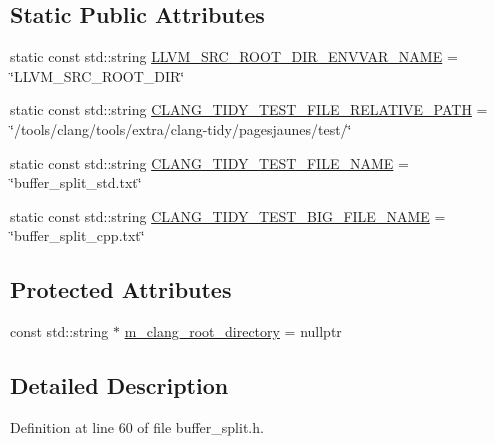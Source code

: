 \subsection*{Static Public Attributes}
\begin{DoxyCompactItemize}
\item 
static const std\+::string \hyperlink{classclang_1_1tidy_1_1pagesjaunes_1_1test_1_1_buffer_split_test_a10427164591975d9f61f4ff317f28450}{L\+L\+V\+M\+\_\+\+S\+R\+C\+\_\+\+R\+O\+O\+T\+\_\+\+D\+I\+R\+\_\+\+E\+N\+V\+V\+A\+R\+\_\+\+N\+A\+ME} = \char`\"{}L\+L\+V\+M\+\_\+\+S\+R\+C\+\_\+\+R\+O\+O\+T\+\_\+\+D\+IR\char`\"{}
\item 
static const std\+::string \hyperlink{classclang_1_1tidy_1_1pagesjaunes_1_1test_1_1_buffer_split_test_a8bac7677f47c0595774f1f74c662814c}{C\+L\+A\+N\+G\+\_\+\+T\+I\+D\+Y\+\_\+\+T\+E\+S\+T\+\_\+\+F\+I\+L\+E\+\_\+\+R\+E\+L\+A\+T\+I\+V\+E\+\_\+\+P\+A\+TH} = \char`\"{}/tools/clang/tools/extra/clang-\/tidy/pagesjaunes/test/\char`\"{}
\item 
static const std\+::string \hyperlink{classclang_1_1tidy_1_1pagesjaunes_1_1test_1_1_buffer_split_test_a48dd976def1f1edb36ecc31b10ecf473}{C\+L\+A\+N\+G\+\_\+\+T\+I\+D\+Y\+\_\+\+T\+E\+S\+T\+\_\+\+F\+I\+L\+E\+\_\+\+N\+A\+ME} = \char`\"{}buffer\+\_\+split\+\_\+std.\+txt\char`\"{}
\item 
static const std\+::string \hyperlink{classclang_1_1tidy_1_1pagesjaunes_1_1test_1_1_buffer_split_test_accde5ff45a889d7a010bfbfbef8b8d20}{C\+L\+A\+N\+G\+\_\+\+T\+I\+D\+Y\+\_\+\+T\+E\+S\+T\+\_\+\+B\+I\+G\+\_\+\+F\+I\+L\+E\+\_\+\+N\+A\+ME} = \char`\"{}buffer\+\_\+split\+\_\+cpp.\+txt\char`\"{}
\end{DoxyCompactItemize}
\subsection*{Protected Attributes}
\begin{DoxyCompactItemize}
\item 
const std\+::string $\ast$ \hyperlink{classclang_1_1tidy_1_1pagesjaunes_1_1test_1_1_buffer_split_test_a8cd9cf3cf28a83148a9e902aa8abec6d}{m\+\_\+clang\+\_\+root\+\_\+directory} = nullptr
\end{DoxyCompactItemize}


\subsection{Detailed Description}


Definition at line 60 of file buffer\+\_\+split.\+h.



